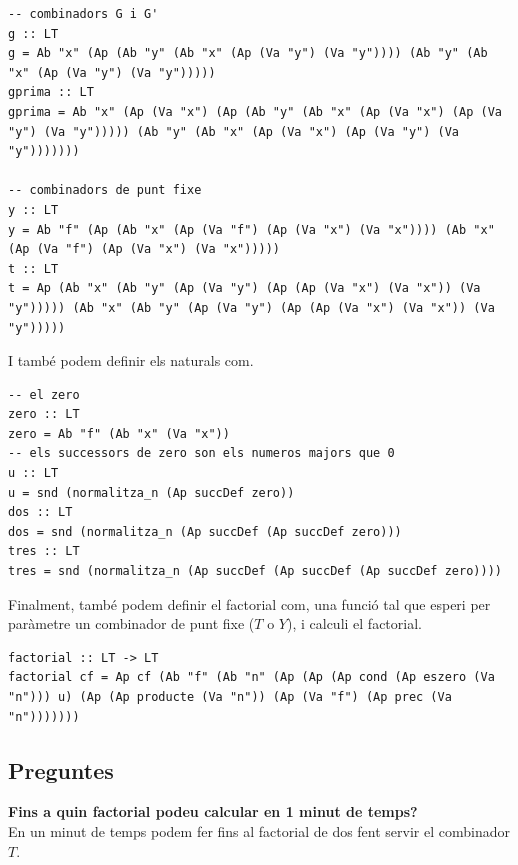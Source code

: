 \documentclass[10pt,a4paper]{article}
\begin{document}
\clearpage

\lstset{language=Haskell, breaklines=true, basicstyle=\footnotesize}
\begin{lstlisting}[frame=mystyle]
-- combinadors G i G'
g :: LT
g = Ab "x" (Ap (Ab "y" (Ab "x" (Ap (Va "y") (Va "y")))) (Ab "y" (Ab "x" (Ap (Va "y") (Va "y")))))
gprima :: LT
gprima = Ab "x" (Ap (Va "x") (Ap (Ab "y" (Ab "x" (Ap (Va "x") (Ap (Va "y") (Va "y"))))) (Ab "y" (Ab "x" (Ap (Va "x") (Ap (Va "y") (Va "y")))))))

-- combinadors de punt fixe
y :: LT
y = Ab "f" (Ap (Ab "x" (Ap (Va "f") (Ap (Va "x") (Va "x")))) (Ab "x" (Ap (Va "f") (Ap (Va "x") (Va "x")))))
t :: LT
t = Ap (Ab "x" (Ab "y" (Ap (Va "y") (Ap (Ap (Va "x") (Va "x")) (Va "y"))))) (Ab "x" (Ab "y" (Ap (Va "y") (Ap (Ap (Va "x") (Va "x")) (Va "y")))))
\end{lstlisting}

I també podem definir els naturals com.

\lstset{language=Haskell, breaklines=true, basicstyle=\footnotesize}
\begin{lstlisting}[frame=mystyle]
-- el zero
zero :: LT
zero = Ab "f" (Ab "x" (Va "x"))
-- els successors de zero son els numeros majors que 0
u :: LT
u = snd (normalitza_n (Ap succDef zero))
dos :: LT
dos = snd (normalitza_n (Ap succDef (Ap succDef zero)))
tres :: LT
tres = snd (normalitza_n (Ap succDef (Ap succDef (Ap succDef zero))))
\end{lstlisting}

Finalment, també podem definir el factorial com, una funció tal que esperi per paràmetre un combinador de punt fixe ($T$ o $Y$), i calculi el factorial.

\lstset{language=Haskell, breaklines=true, basicstyle=\footnotesize}
\begin{lstlisting}[frame=mystyle]
factorial :: LT -> LT
factorial cf = Ap cf (Ab "f" (Ab "n" (Ap (Ap (Ap cond (Ap eszero (Va "n"))) u) (Ap (Ap producte (Va "n")) (Ap (Va "f") (Ap prec (Va "n")))))))
\end{lstlisting}

\clearpage

\subsection{Preguntes}

\textbf{Fins a quin factorial podeu calcular en 1 minut de temps?} \\

En un minut de temps podem fer fins al factorial de dos fent servir el combinador $T$.
\end{document}
